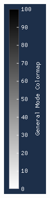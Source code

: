 \documentclass[times, utf8, diplomski]{fer}
\begin{document}
\begin{figure} [H]
     \centering
     \begin{subfigure}[h]{0.17\textwidth}
         \centering
         \includegraphics[width=\textwidth]{linear_colormap.png}

\end{subfigure}
\end{figure}
\end{document}
